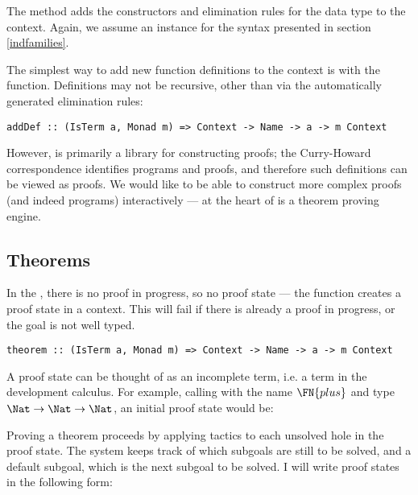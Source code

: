 The  method adds the constructors and elimination
rules for the data type to the context. Again, we assume an instance
for the syntax presented in section \ref{indfamilies}.

The simplest way to add new function definitions to the context is
with the  function. Definitions may not be recursive,
other than via the automatically generated elimination rules:

\verb+addDef :: (IsTerm a, Monad m) => Context -> Name -> a -> m Context+

However, \Ivor{} is primarily a library for constructing proofs; the
Curry-Howard correspondence identifies programs and proofs, and
therefore such definitions can be viewed as proofs. We would like to
be able to construct more complex proofs (and indeed programs)
interactively --- at the heart of \Ivor{} is a theorem
proving engine.

\subsection{Theorems}

In the , there is no proof in progress, so no
proof state --- the  function creates a proof state in
a context. This will fail if there is already a proof in progress, or
the goal is not well typed.

\verb+theorem :: (IsTerm a, Monad m) => Context -> Name -> a -> m Context+

A proof state can be thought of as an incomplete term, i.e. a
term in the development calculus. For example, calling 
with the name $\FN{plus}$ and type $\Nat\to\Nat\to\Nat$, an initial
proof state would be:


Proving a theorem proceeds by applying tactics to each unsolved hole
in the proof state. The system keeps track of which subgoals are still
to be solved, and a default subgoal, which is the next subgoal to be
solved. I will write proof states in the following form:


